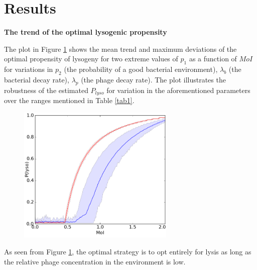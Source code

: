 \documentclass[12pt,letterpaper]{article}
\begin{document}
\section*{Results}
\textbf{The trend of the optimal lysogenic propensity}\newline

The plot in Figure \ref{fig1} shows the mean trend and maximum deviations of the optimal propensity of lysogeny for two extreme values of $p_1$ as a function of $MoI$ for variations in $p_2$ (the probability of a good bacterial environment), $\lambda_b$ (the bacterial decay rate), $\lambda_p$ (the phage decay rate). The plot illustrates the robustness of the estimated $P_{lyso}$ for variation in the aforementioned parameters over the ranges mentioned in Table \ref{tab1}. %

\begin{figure}
\includegraphics[width=75mm]{combo.png}
\captionsetup{labelformat=empty} %
\caption{} %
\label{fig1} %
\end{figure}%
As seen from Figure \ref{fig1}, the optimal strategy is to opt entirely for lysis as long as the relative phage concentration in the environment is low. 
\end{document}
